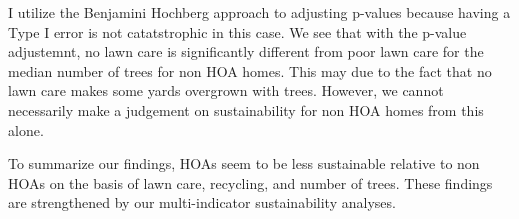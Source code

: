 \documentclass{article}
\begin{document}
I utilize the Benjamini Hochberg approach \citep{rcompanion} to adjusting p-values because having a Type I error is not catatstrophic in this case. We see that with the p-value adjustemnt, no lawn care is significantly different from poor lawn care for the median number of trees for non HOA homes. This may due to the fact that no lawn care makes some yards overgrown with trees. However, we cannot necessarily make a judgement on sustainability for non HOA homes from this alone. 

To summarize our findings, HOAs seem to be less sustainable relative to non HOAs on the basis of lawn care, recycling, and number of trees. These findings are strengthened by our multi-indicator sustainability analyses. 
\newpage

\end{document}
